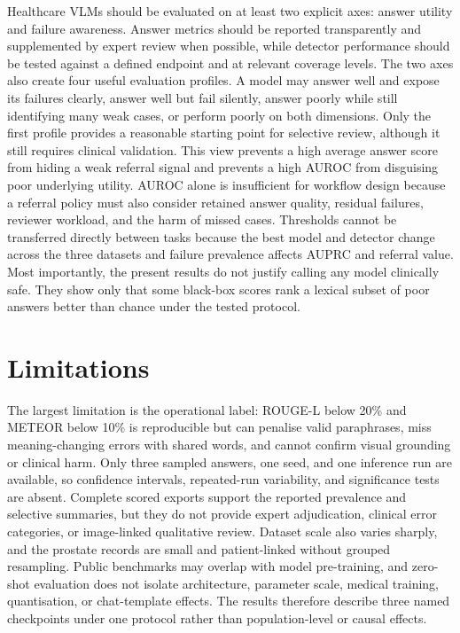 Healthcare VLMs should be evaluated on at least two explicit axes: answer utility and failure awareness. Answer metrics should be reported transparently and supplemented by expert review when possible, while detector performance should be tested against a defined endpoint and at relevant coverage levels. The two axes also create four useful evaluation profiles. A model may answer well and expose its failures clearly, answer well but fail silently, answer poorly while still identifying many weak cases, or perform poorly on both dimensions. Only the first profile provides a reasonable starting point for selective review, although it still requires clinical validation. This view prevents a high average answer score from hiding a weak referral signal and prevents a high AUROC from disguising poor underlying utility. AUROC alone is insufficient for workflow design because a referral policy must also consider retained answer quality, residual failures, reviewer workload, and the harm of missed cases. Thresholds cannot be transferred directly between tasks because the best model and detector change across the three datasets and failure prevalence affects AUPRC and referral value. Most importantly, the present results do not justify calling any model clinically safe. They show only that some black-box scores rank a lexical subset of poor answers better than chance under the tested protocol.

\section{Limitations}

The largest limitation is the operational label: ROUGE-L below 20\% and METEOR below 10\% is reproducible but can penalise valid paraphrases, miss meaning-changing errors with shared words, and cannot confirm visual grounding or clinical harm. Only three sampled answers, one seed, and one inference run are available, so confidence intervals, repeated-run variability, and significance tests are absent. Complete scored exports support the reported prevalence and selective summaries, but they do not provide expert adjudication, clinical error categories, or image-linked qualitative review. Dataset scale also varies sharply, and the prostate records are small and patient-linked without grouped resampling. Public benchmarks may overlap with model pre-training, and zero-shot evaluation does not isolate architecture, parameter scale, medical training, quantisation, or chat-template effects. The results therefore describe three named checkpoints under one protocol rather than population-level or causal effects.

